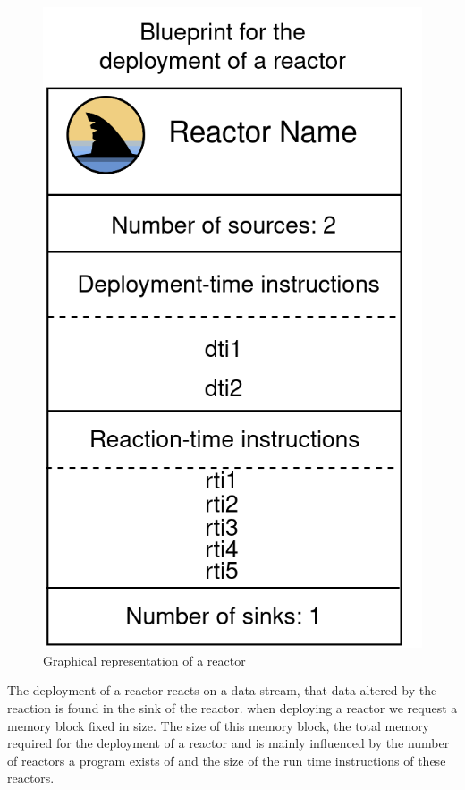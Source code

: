 \documentclass[a4paper]{book}
\begin{document}
\begin{figure}[h]
	\caption{Graphical representation of a reactor}
	\includegraphics[scale=0.2]{reactor300.drawio}
	\centering
\end{figure}

The deployment of a reactor reacts on a data stream, that data altered by the reaction is found in the sink of the reactor. when deploying a reactor we request a memory block fixed in size. The size of this memory block, the total memory required for the deployment of a reactor and is mainly influenced by the number of reactors a program exists of and the size of the run time instructions of these reactors.
 
\end{document}
